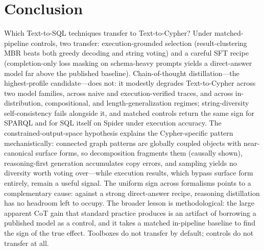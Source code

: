 \documentclass[11pt]{article}
\begin{document}
\section{Conclusion}
Which Text-to-SQL techniques transfer to Text-to-Cypher? Under matched-pipeline controls, two
transfer: execution-grounded selection (result-clustering MBR beats both greedy decoding and string
voting) and a careful SFT recipe (completion-only loss masking on schema-heavy prompts yields a
direct-answer model far above the published baseline). Chain-of-thought distillation---the
highest-profile candidate---does not: it modestly degrades Text-to-Cypher across two model
families, across naive and execution-verified traces, and across in-distribution, compositional,
and length-generalization regimes; string-diversity self-consistency fails alongside it, and
matched controls return the same sign for SPARQL and for SQL itself on Spider under execution
accuracy. The constrained-output-space hypothesis explains the Cypher-specific pattern
mechanistically: connected graph patterns are globally coupled objects with near-canonical surface
forms, so decomposition fragments them (causally shown), reasoning-first generation accumulates
copy errors, and sampling yields no diversity worth voting over---while execution results, which
bypass surface form entirely, remain a useful signal. The uniform sign across formalisms points to
a complementary cause: against a strong direct-answer recipe, reasoning distillation has no
headroom left to occupy. The broader lesson is methodological: the large apparent CoT gain that
standard practice produces is an artifact of borrowing a published model as a control, and it takes
a matched in-pipeline baseline to find the sign of the true effect. Toolboxes do not transfer by
default; controls do not transfer at all.



\end{document}
